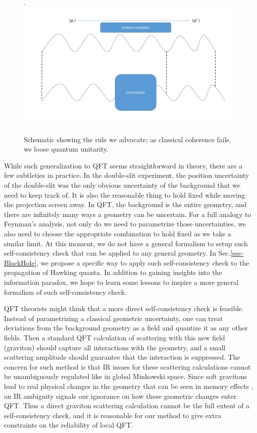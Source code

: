 \documentclass[aps,showpacs,onecolumn,floats,prd,superscriptaddress,nofootinbib]{revtex4-1}
\begin{document}
\begin{figure}[tb]
\begin{center}.
\includegraphics[scale = 0.5]{bh_coherence.pdf}
\caption{Schematic showing the rule we advocate; as classical coherence fails, we loose quantum unitarity.}
\label{fig-QFT}
\end{center}
\end{figure}

While such generalization to QFT seems straightforward in theory, there are a few subtleties in practice.
In the double-slit experiment, the position uncertainty of the double-slit was the only obvious uncertainty of the background that we need to keep track of.
It is also the reasonable thing to hold fixed while moving the projection screen away.
In QFT, the background is the entire geometry, and there are infinitely many ways a geometry can be uncertain.
For a full analogy to Feynman's analysis, not only do we need to parametrize those uncertainties, we also need to choose the appropriate combination to hold fixed as we take a similar limit.
At this moment, we do not have a general formalism to setup such self-consistency check that can be applied to any general geometry. 
In Sec.\ref{sec-BlackHole}, we propose a specific way to apply such self-consistency check to the propagation of Hawking quanta.
In addition to gaining insights into the information paradox, we hope to learn some lessons to inspire a more general formalism of such self-consistency check.

QFT theorists might think that a more direct self-consistency check is feasible.
Instead of parametrizing a classical geometric uncertainty, one can treat deviations from the background geometry as a field and quantize it as any other fields.
Then a standard QFT calculation of scattering with this new field (graviton) should capture all interactions with the geometry, and a small scattering amplitude should guarantee that the interaction is suppressed. 
The concern for such method is that IR issues for these scattering calculations cannot be unambiguously regulated like in global Minkowski space.
Since soft gravitons lead to real physical changes in the geometry that can be seen in memory effects \cite{Wei65,HeLys14}, an IR ambiguity signals our ignorance on how these geometric changes enter QFT.
Thus a direct graviton scattering calculation cannot be the full extent of a self-consistency check, and it is reasonable for our method to give extra constraints on the reliability of local QFT.
\end{document}
